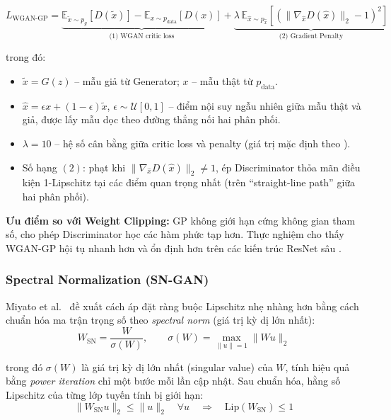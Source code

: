 \begin{equation}
\label{eq:wgan_gp}
L_{\text{WGAN-GP}} =
\underbrace{\mathbb{E}_{\tilde{x} \sim p_g}[D(\tilde{x})] - \mathbb{E}_{x \sim p_{\text{data}}}[D(x)]}_{\text{(1) WGAN critic loss}} 
+
\underbrace{\lambda \, \mathbb{E}_{\hat{x} \sim p_{\hat{x}}}\!\left[\left(\|\nabla_{\hat{x}} D(\hat{x})\|_2 - 1\right)^2\right]}_{\text{(2) Gradient Penalty}}
\end{equation}

\noindent trong đó:
\begin{itemize}
    \item $\tilde{x} = G(z)$ -- mẫu giả từ Generator; $x$ -- mẫu thật từ $p_{\text{data}}$.
    \item $\hat{x} = \epsilon x + (1-\epsilon)\tilde{x}$, $\epsilon \sim \mathcal{U}[0,1]$ -- điểm nội suy ngẫu nhiên giữa mẫu thật và giả, được lấy mẫu dọc theo đường thẳng nối hai phân phối.
    \item $\lambda = 10$ -- hệ số cân bằng giữa critic loss và penalty (giá trị mặc định theo \cite{Gulrajani2017}).
    \item Số hạng $(2)$: phạt khi $\|\nabla_{\hat{x}} D(\hat{x})\|_2 \neq 1$, ép Discriminator thỏa mãn điều kiện 1-Lipschitz tại các điểm quan trọng nhất (trên ``straight-line path'' giữa hai phân phối).
\end{itemize}

\textbf{Ưu điểm so với Weight Clipping:} GP không giới hạn cứng không gian tham số, cho phép Discriminator học các hàm phức tạp hơn. Thực nghiệm cho thấy WGAN-GP hội tụ nhanh hơn và ổn định hơn trên các kiến trúc ResNet sâu \cite{Gulrajani2017}.

\subsubsection{Spectral Normalization (SN-GAN)}
\label{subsubsec:sn_gan}

Miyato et al.~\cite{Miyato2018} đề xuất cách áp đặt ràng buộc Lipschitz nhẹ nhàng hơn bằng cách chuẩn hóa ma trận trọng số theo \textit{spectral norm} (giá trị kỳ dị lớn nhất):
\begin{equation}
\label{eq:spectral_norm}
W_{\text{SN}} = \frac{W}{\sigma(W)}, \qquad \sigma(W) = \max_{\|u\|=1} \|Wu\|_2
\end{equation}

\noindent trong đó $\sigma(W)$ là giá trị kỳ dị lớn nhất (singular value) của $W$, tính hiệu quả bằng \textit{power iteration} chỉ một bước mỗi lần cập nhật. Sau chuẩn hóa, hằng số Lipschitz của từng lớp tuyến tính bị giới hạn:
\begin{equation}
\label{eq:lipschitz_sn}
\|W_{\text{SN}} u\|_2 \leq \|u\|_2 \quad \forall u \quad \Rightarrow \quad \text{Lip}(W_{\text{SN}}) \leq 1
\end{equation}

